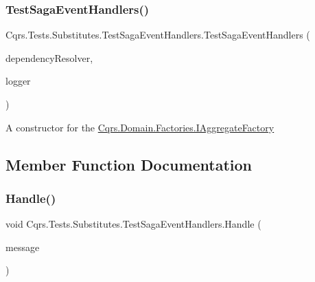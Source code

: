 \subsubsection{\texorpdfstring{Test\+Saga\+Event\+Handlers()}{TestSagaEventHandlers()}\hspace{0.1cm}{\footnotesize\ttfamily [2/2]}}
{\footnotesize\ttfamily Cqrs.\+Tests.\+Substitutes.\+Test\+Saga\+Event\+Handlers.\+Test\+Saga\+Event\+Handlers (\begin{DoxyParamCaption}\item[{\hyperlink{interfaceCqrs_1_1Configuration_1_1IDependencyResolver}{I\+Dependency\+Resolver}}]{dependency\+Resolver,  }\item[{I\+Logger}]{logger }\end{DoxyParamCaption})}



A constructor for the \hyperlink{interfaceCqrs_1_1Domain_1_1Factories_1_1IAggregateFactory}{Cqrs.\+Domain.\+Factories.\+I\+Aggregate\+Factory} 



\subsection{Member Function Documentation}
\mbox{\label{classCqrs_1_1Tests_1_1Substitutes_1_1TestSagaEventHandlers_a6160e0aacb592f32da125c2e22e64fe4_a6160e0aacb592f32da125c2e22e64fe4}} 
\subsubsection{\texorpdfstring{Handle()}{Handle()}\hspace{0.1cm}{\footnotesize\ttfamily [1/3]}}
{\footnotesize\ttfamily void Cqrs.\+Tests.\+Substitutes.\+Test\+Saga\+Event\+Handlers.\+Handle (\begin{DoxyParamCaption}\item[{\hyperlink{classCqrs_1_1Tests_1_1Substitutes_1_1TestAggregateDidSomething}{Test\+Aggregate\+Did\+Something}}]{message }\end{DoxyParamCaption})}

